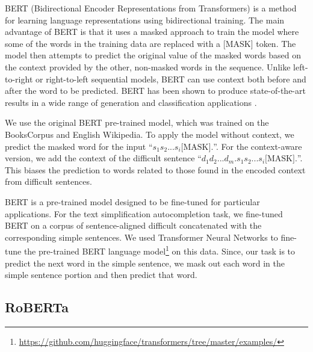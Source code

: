 \documentclass[11pt]{article}
\newcommand{\comment}[1]{\textcolor{blue}{In Progress: #1}}
\begin{document}

BERT (Bidirectional Encoder Representations from Transformers) is a method for learning language representations using bidirectional training.  The main advantage of BERT is that it uses a masked approach to train the model where some of the words in the training data are replaced with a [MASK] token. The model then attempts to predict the original value of the masked words based on the context provided by the other, non-masked words in the sequence.  Unlike left-to-right or right-to-left sequential models, BERT can use context both before and after the word to be predicted.  BERT has been shown to produce state-of-the-art results in a wide range of generation and classification applications \cite{devlin2018bert}.

We use the original BERT pre-trained model, which was trained on the BooksCorpus \cite{zhu2015aligning} and English Wikipedia. To apply the model without context, we predict the masked word for the input ``$s_1 s_2 ... s_i \mbox{[MASK]} .$''. For the context-aware version, we add the context of the difficult sentence
``$d_1 d_2 ... d_m. s_1 s_2 ... s_i \mbox{[MASK]} .$''. This biases the prediction to words related to those found in the encoded context from difficult sentences.

BERT is a pre-trained model designed to be fine-tuned for particular applications. For the text simplification autocompletion task, we fine-tuned BERT on a corpus of sentence-aligned difficult concatenated with the corresponding simple sentences. We used Transformer Neural Networks to fine-tune the pre-trained BERT language model\footnote{\url{https://github.com/huggingface/transformers/tree/master/examples/}} on this data. Since, our task is to predict the next word in the simple sentence, we mask out each word in the simple sentence portion and then predict that word.


\subsection{RoBERTa}
\end{document}
